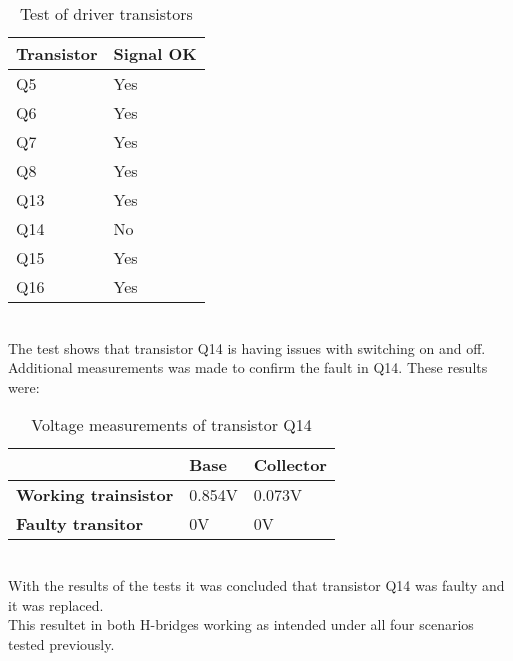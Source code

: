 \begin{table}[h]
\centering
\begin{tabular}{|l|l|}
\hline
\textbf{Transistor} & \textbf{Signal OK} \\ \hline
\rowcolor[HTML]{EFEFEF} 
Q5                  & Yes                \\ \hline
Q6                  & Yes                \\ \hline
\rowcolor[HTML]{EFEFEF} 
Q7                  & Yes                \\ \hline
Q8                  & Yes                \\ \hline
\rowcolor[HTML]{EFEFEF} 
Q13                 & Yes                \\ \hline
Q14                 & No                 \\ \hline
\rowcolor[HTML]{EFEFEF} 
Q15                 & Yes                \\ \hline
Q16                 & Yes                \\ \hline
\end{tabular}
\caption{Test of driver transistors}
\label{drivertransistortest}
\end{table}\\
The test shows that transistor Q14 is having issues with switching on and off.\\
Additional measurements was made to confirm the fault in Q14. These results were:
\begin{table}[h]
\centering
\begin{tabular}{l|l|l}
\textbf{}                    & \textbf{Base} & \textbf{Collector} \\ \hline
\textbf{Working trainsistor} & 0.854V        & 0.073V             \\ \hline
\textbf{Faulty transitor}    & 0V            & 0V                
\end{tabular}
\caption{Voltage measurements of transistor Q14}
\label{q14measurements}
\end{table}\\
With the results of the tests it was concluded that transistor Q14 was faulty and it was replaced.\\
This resultet in both H-bridges working as intended under all four scenarios tested previously.
